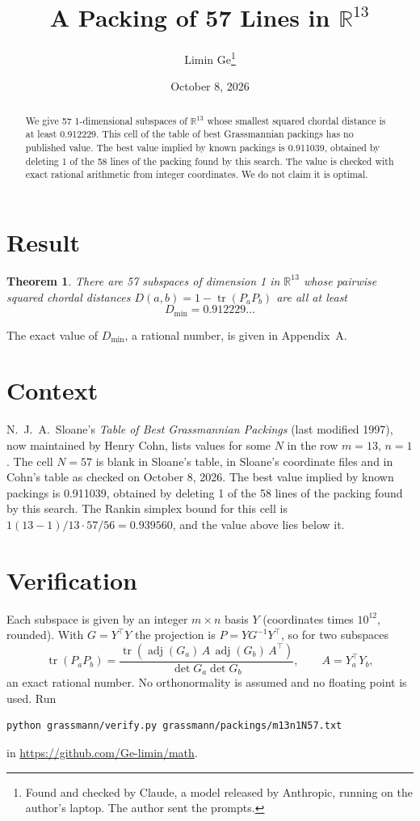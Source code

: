 \documentclass[11pt,a4paper]{article}
\title{A Packing of 57 Lines in $\mathbb{R}^{13}$}
\author{Limin Ge\thanks{Found and checked by Claude, a model released by Anthropic, running on the author's laptop. The author sent the prompts.}}
\date{October 8, 2026}
\newtheorem*{theorem}{Theorem}
\begin{document}
\maketitle
\begin{abstract}
We give 57 1-dimensional subspaces of $\mathbb{R}^{13}$ whose smallest squared chordal distance is at least 0.912229. This cell of the table of best Grassmannian packings has no published value. The best value implied by known packings is 0.911039, obtained by deleting 1 of the 58 lines of the packing found by this search. The value is checked with exact rational arithmetic from integer coordinates. We do not claim it is optimal.
\end{abstract}

\section{Result}
\begin{theorem}
There are 57 subspaces of dimension 1 in $\mathbb{R}^{13}$ whose pairwise squared chordal distances $D(a,b) = 1 - \operatorname{tr}(P_aP_b)$ are all at least
\[ D_{\min} = 0.912229\ldots \]
\end{theorem}
The exact value of $D_{\min}$, a rational number, is given in Appendix~A.


\section{Context}
N.~J.~A.~Sloane's \emph{Table of Best Grassmannian Packings} (last modified 1997), now maintained by Henry Cohn, lists values for some $N$ in the row $m=13$, $n=1$. The cell $N=57$ is blank in Sloane's table, in Sloane's coordinate files and in Cohn's table as checked on October 8, 2026. The best value implied by known packings is 0.911039, obtained by deleting 1 of the 58 lines of the packing found by this search. The Rankin simplex bound for this cell is $1(13-1)/13\cdot 57/56 = 0.939560$, and the value above lies below it.


\section{Verification}
Each subspace is given by an integer $m\times n$ basis $Y$ (coordinates times $10^{12}$, rounded). With $G=Y^\top Y$ the projection is $P=YG^{-1}Y^\top$, so for two subspaces
\[ \operatorname{tr}(P_aP_b)=\frac{\operatorname{tr}(\operatorname{adj}(G_a)\,A\,\operatorname{adj}(G_b)\,A^\top)}{\det G_a\det G_b},\qquad A=Y_a^\top Y_b, \]
an exact rational number. No orthonormality is assumed and no floating point is used. Run
\begin{verbatim}
python grassmann/verify.py grassmann/packings/m13n1N57.txt
\end{verbatim}
in \url{https://github.com/Ge-limin/math}.
\end{document}
